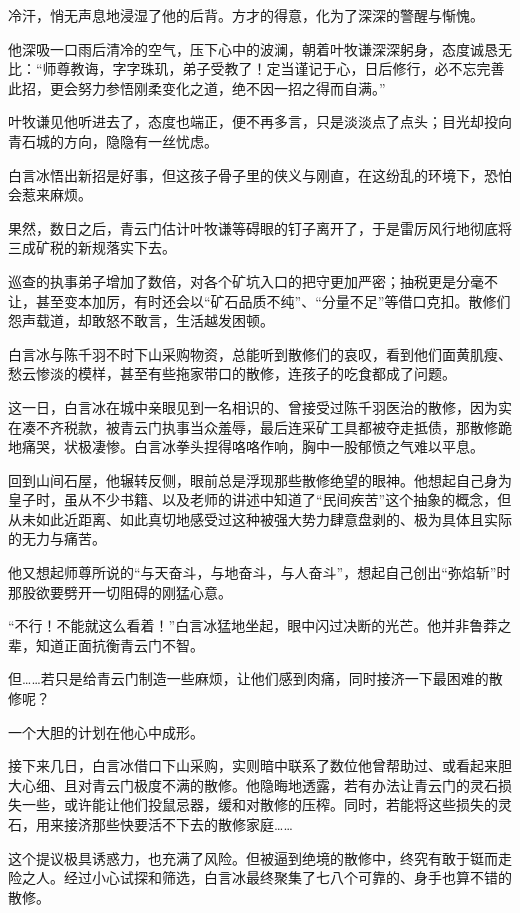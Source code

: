 冷汗，悄无声息地浸湿了他的后背。方才的得意，化为了深深的警醒与惭愧。

他深吸一口雨后清冷的空气，压下心中的波澜，朝着叶牧谦深深躬身，态度诚恳无比：“师尊教诲，字字珠玑，弟子受教了！定当谨记于心，日后修行，必不忘完善此招，更会努力参悟刚柔变化之道，绝不因一招之得而自满。”

叶牧谦见他听进去了，态度也端正，便不再多言，只是淡淡点了点头；目光却投向青石城的方向，隐隐有一丝忧虑。

白言冰悟出新招是好事，但这孩子骨子里的侠义与刚直，在这纷乱的环境下，恐怕会惹来麻烦。

\vspace{2em}

果然，数日之后，青云门估计叶牧谦等碍眼的钉子离开了，于是雷厉风行地彻底将三成矿税的新规落实下去。

巡查的执事弟子增加了数倍，对各个矿坑入口的把守更加严密；抽税更是分毫不让，甚至变本加厉，有时还会以“矿石品质不纯”、“分量不足”等借口克扣。散修们怨声载道，却敢怒不敢言，生活越发困顿。

白言冰与陈千羽不时下山采购物资，总能听到散修们的哀叹，看到他们面黄肌瘦、愁云惨淡的模样，甚至有些拖家带口的散修，连孩子的吃食都成了问题。

这一日，白言冰在城中亲眼见到一名相识的、曾接受过陈千羽医治的散修，因为实在凑不齐税款，被青云门执事当众羞辱，最后连采矿工具都被夺走抵债，那散修跪地痛哭，状极凄惨。白言冰拳头捏得咯咯作响，胸中一股郁愤之气难以平息。

回到山间石屋，他辗转反侧，眼前总是浮现那些散修绝望的眼神。他想起自己身为皇子时，虽从不少书籍、以及老师的讲述中知道了“民间疾苦”这个抽象的概念，但从未如此近距离、如此真切地感受过这种被强大势力肆意盘剥的、极为具体且实际的无力与痛苦。

他又想起师尊所说的“与天奋斗，与地奋斗，与人奋斗”，想起自己创出“弥焰斩”时那股欲要劈开一切阻碍的刚猛心意。

“不行！不能就这么看着！”白言冰猛地坐起，眼中闪过决断的光芒。他并非鲁莽之辈，知道正面抗衡青云门不智。

但……若只是给青云门制造一些麻烦，让他们感到肉痛，同时接济一下最困难的散修呢？

一个大胆的计划在他心中成形。

接下来几日，白言冰借口下山采购，实则暗中联系了数位他曾帮助过、或看起来胆大心细、且对青云门极度不满的散修。他隐晦地透露，若有办法让青云门的灵石损失一些，或许能让他们投鼠忌器，缓和对散修的压榨。同时，若能将这些损失的灵石，用来接济那些快要活不下去的散修家庭……

这个提议极具诱惑力，也充满了风险。但被逼到绝境的散修中，终究有敢于铤而走险之人。经过小心试探和筛选，白言冰最终聚集了七八个可靠的、身手也算不错的散修。

